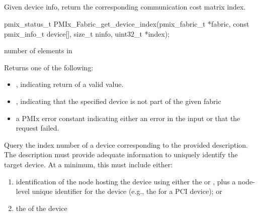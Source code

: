 \subsection{}

\summary

Given device info, return the corresponding communication cost matrix index.

\format

\cspecificstart
\begin{codepar}
pmix_status_t
PMIx_Fabric_get_device_index(pmix_fabric_t *fabric,
                      const pmix_info_t device[],
                      size_t ninfo,
                      uint32_t *index);
\end{codepar}
\cspecificend

\begin{arglist}
 number of elements in 
\end{arglist}

Returns one of the following:

\begin{itemize}
    \item {}, indicating return of a valid value.
    \item {}, indicating that the specified device is not part of the given fabric
    \item a \ac{PMIx} error constant indicating either an error in the input or that the request failed.
\end{itemize}


\descr

Query the index number of a device corresponding to the provided description. The description must provide adequate information to uniquely identify the target device. At a minimum, this must include either:

\begin{enumerate}[label=\alph*)]
    \item identification of the node hosting the device using either the  or , plus a node-level unique identifier for the device (e.g., the  for a \ac{PCI} device); or
    \item the  of the device
\end{enumerate}


